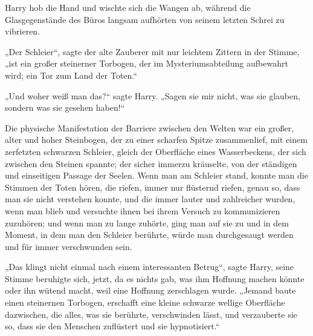 Harry hob die Hand und wischte sich die Wangen ab, während die Glasgegenstände des Büros langsam aufhörten von seinem letzten Schrei zu vibrieren.

„Der Schleier“, sagte der alte Zauberer mit nur leichtem Zittern in der Stimme, „ist ein großer steinerner Torbogen, der im Mysteriumsabteilung aufbewahrt wird; ein Tor zum Land der Toten.“

„Und woher weiß man das?“ sagte Harry.
„Sagen sie mir nicht, was sie glauben, sondern was sie gesehen haben!“

Die physische Manifestation der Barriere zwischen den Welten war ein großer, alter und hoher Steinbogen, der zu einer scharfen Spitze zusammenlief, mit einem zerfetzten schwarzen Schleier, gleich der Oberfläche eines Wasserbeckens, der sich zwischen den Steinen spannte; der sicher immerzu kräuselte, von der ständigen und einseitigen Passage der Seelen. Wenn man am Schleier stand, konnte man die Stimmen der Toten hören, die riefen, immer nur flüsternd riefen, genau so, dass man sie nicht verstehen konnte, und die immer lauter und zahlreicher wurden, wenn man blieb und versuchte ihnen bei ihrem Versuch zu kommunizieren zuzuhören; und wenn man zu lange zuhörte, ging man auf sie zu und in dem Moment, in dem man den Schleier berührte, würde man durchgesaugt werden und für immer verschwunden sein.

„Das klingt nicht einmal nach einem interessanten Betrug“, sagte Harry, seine Stimme beruhigte sich, jetzt, da es nichts gab, was ihm Hoffnung machen könnte oder ihn wütend macht, weil eine Hoffnung zerschlagen wurde.
„Jemand baute einen steinernen Torbogen, erschafft eine kleine schwarze wellige Oberfläche dazwischen, die alles, was sie berührte, verschwinden lässt, und verzauberte sie so, dass sie den Menschen zuflüstert und sie hypnotisiert.“

